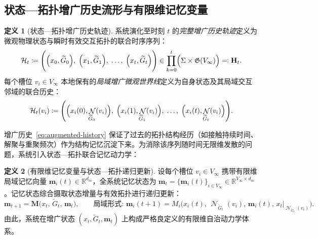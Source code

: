 \documentclass[11pt,a4paper]{article}
\numberwithin{equation}{section}
\theoremstyle{definition}
\newtheorem{definition}{定义}[section]
\theoremstyle{remark}
\DeclareMathOperator{\Ncal}{\mathcal{N}}   %
\begin{document}
	\subsection{状态—拓扑增广历史流形与有限维记忆变量}

	\begin{definition}[状态—拓扑增广历史轨迹]\label{def:augmented-history}
		系统演化至时刻 $t$ 的\emph{完整增广历史轨迹}定义为微观物理状态与瞬时有效交互拓扑的联合时序序列：
		\begin{equation}
			\mathcal{H}_t \coloneqq \Biggl( \Bigl(x_0, \widetilde{G}_0\Bigr),\; \Bigl(x_1, \widetilde{G}_1\Bigr),\; \dots,\; \Bigl(x_t, \widetilde{G}_t\Bigr) \Biggr) \in \prod_{k=0}^t \Bigl(\Sigma \times \mathfrak{G}(V_\infty)\Bigr) \eqqcolon \mathbf{H}_t.
			\label{eq:augmented-history}
		\end{equation}
		每个槽位 $v_i \in V_\infty$ 本地保有的\emph{局域增广微观世界线}定义为自身状态及其局域交互邻域的联合历史：
		\begin{equation}
			\mathcal{H}_t(v_i) \coloneqq \Biggl( \Bigl(x_i(0), \Ncal_{\widetilde{G}_0}(v_i)\Bigr),\; \Bigl(x_i(1), \Ncal_{\widetilde{G}_1}(v_i)\Bigr),\; \dots,\; \Bigl(x_i(t), \Ncal_{\widetilde{G}_t}(v_i)\Bigr) \Biggr).
			\label{eq:local-worldline}
		\end{equation}
	\end{definition}

	增广历史~\eqref{eq:augmented-history} 保证了过去的拓扑结构经历（如接触持续时间、解聚与重聚频次）作为结构记忆沉淀下来。为消除该序列随时间无限维发散的问题，系统引入状态—拓扑联合记忆动力学：

	\begin{definition}[有限维记忆变量与状态—拓扑递归更新]\label{def:memory-variable}
		设每个槽位 $v_i\in V_\infty$ 携带有限维局域记忆向量 $\mathbf{m}_i(t) \in \mathbb{R}^{d_m}$，全系统记忆状态为 $\mathbf{m}_t = \{\mathbf{m}_i(t)\}_{i\in V_\infty} \in \mathbb{R}^{V_\infty \times d_m}$。记忆状态综合摄取状态增量与有效拓扑进行递归更新：
		\begin{equation}
			\mathbf{m}_{t+1} = \mathbf{M}\bigl(x_t,\, \widetilde{G}_t,\, \mathbf{m}_t\bigr), \qquad \text{局域形式: } \mathbf{m}_i(t+1) = M_i\bigl(x_i(t),\, \Ncal_{\widetilde{G}_t}(v_i),\, \mathbf{m}_i(t),\, x_t|_{\Ncal_{\widetilde{G}_t}(v_i)}\bigr).
			\label{eq:memory-update}
		\end{equation}
		由此，系统在增广状态 $(x_t, \widetilde{G}_t, \mathbf{m}_t)$ 上构成严格良定义的有限维自治动力学体系。
	\end{definition}
\end{document}
